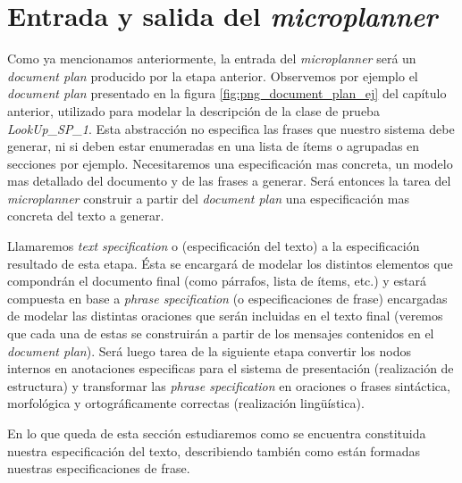 

\section{Entrada y salida del \textit{microplanner}}
Como ya mencionamos anteriormente, la entrada del \textit{microplanner} será un \textit{document plan} producido por la etapa anterior. Observemos por ejemplo el \textit{document plan} presentado en la figura \ref{fig:png_document_plan_ej} del capítulo anterior, utilizado para modelar la descripción de la clase de prueba \emph{LookUp\_SP\_1}. Esta abstracción no especifica las frases que nuestro sistema debe generar, ni si deben estar enumeradas en una lista de ítems o agrupadas en secciones por ejemplo. Necesitaremos una especificación mas concreta, un modelo mas detallado del documento y de las frases a generar. Será entonces la tarea del \textit{microplanner}  construir a partir del \textit{document plan} una especificación mas concreta del texto a generar.

Llamaremos \emph{text specification} o (especificación del texto) a la especificación resultado de esta etapa. Ésta se encargará de modelar los distintos elementos que compondrán el documento final (como párrafos, lista de ítems, etc.) y estará compuesta en base a \textit{phrase specification} (o especificaciones de frase) encargadas de modelar las distintas oraciones que serán incluidas en el texto final (veremos que cada una de estas se construirán a partir de los mensajes contenidos en el \textit{document plan}). Será luego tarea de la siguiente etapa convertir los nodos internos en anotaciones especificas para el sistema de presentación (realización de estructura) y transformar las \emph{phrase specification} en oraciones o frases sintáctica, morfológica y ortográficamente correctas (realización lingüística). 


En lo que queda de esta sección estudiaremos como se encuentra constituida nuestra especificación del texto, describiendo también como están formadas nuestras especificaciones de frase.

